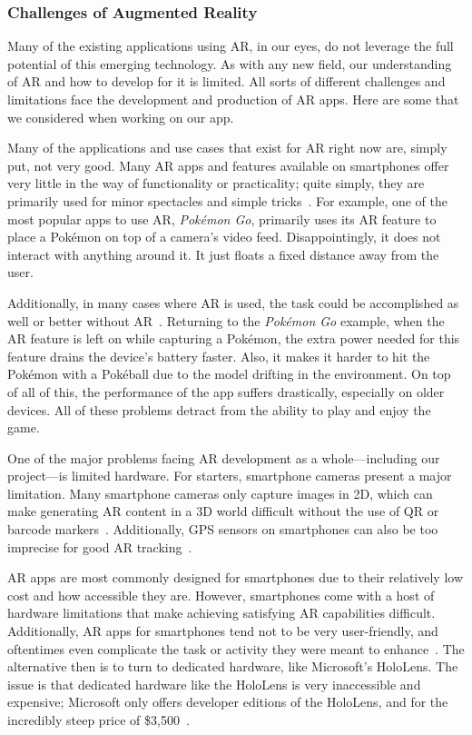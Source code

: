 \documentclass[a4paper, 10pt, american, titlepage]{article}
\begin{document}
\subsubsection{Challenges of Augmented Reality}
\label{sec:challengesOfAugmentedReality}

Many of the existing applications using AR, in our eyes, do not leverage the
full potential of this emerging technology. As with any new field, our
understanding of AR and how to develop for it is limited. All sorts of
different challenges and limitations face the development and production of AR
apps. Here are some that we considered when working on our app.

Many of the applications and use cases that exist for AR right now are, simply
put, not very good. Many AR apps and features available on smartphones offer
very little in the way of functionality or practicality; quite simply, they are
primarily used for minor spectacles and simple
tricks~\autocite{theappsolutions2018}. For example, one of the most popular
apps to use AR, \textit{Pokémon Go}, primarily uses its AR feature to place a
Pokémon on top of a camera's video feed. Disappointingly, it does not interact
with anything around it. It just floats a fixed distance away from the user.

Additionally, in many cases where AR is used, the task could be accomplished as
well or better without AR~\autocite{theappsolutions2018}. Returning to the
\textit{Pokémon Go} example, when the AR feature is left on while capturing a
Pokémon, the extra power needed for this feature drains the device's battery
faster. Also, it makes it harder to hit the Pokémon with a Pokéball due to the
model drifting in the environment. On top of all of this, the performance of
the app suffers drastically, especially on older devices. All of these problems
detract from the ability to play and enjoy the game.

One of the major problems facing AR development as a whole---including our
project---is limited hardware. For starters, smartphone cameras present a
major limitation. Many smartphone cameras only capture images in 2D, which can
make generating AR content in a 3D world difficult without the use of QR or
barcode markers~\autocite{geospatialworld2018}. Additionally, GPS sensors on
smartphones can also be too imprecise for good AR
tracking~\autocite{geospatialworld2018}.

AR apps are most commonly designed for smartphones due to their relatively low
cost and how accessible they are. However, smartphones come with a host of
hardware limitations that make achieving satisfying AR capabilities difficult.
Additionally, AR apps for smartphones tend not to be very user-friendly, and
oftentimes even complicate the task or activity they were meant to
enhance~\autocite{theappsolutions2018}.  The alternative then is to turn to
dedicated hardware, like Microsoft's HoloLens. The issue is that dedicated
hardware like the HoloLens is very inaccessible and expensive; Microsoft only
offers developer editions of the HoloLens, and for the incredibly steep price
of \$3,500~\autocite{microsoft2019}.
\end{document}
